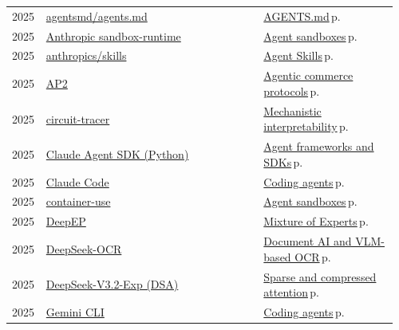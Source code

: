 \documentclass[10pt,a4paper,openany]{report}
\begin{document}
{\begin{longtable}{@{}p{0.07\linewidth}>{\raggedright}p{0.55\linewidth}>{\raggedright\arraybackslash}p{0.34\linewidth}@{}}
2025 & \href{https://github.com/agentsmd/agents.md}{agentsmd/agents.md} & \hyperref[c:protocols-6]{AGENTS.md}\,{\color{muted}\scriptsize p.\,\pageref{c:protocols-6}}\\
2025 & \href{https://github.com/anthropic-experimental/sandbox-runtime}{Anthropic sandbox-runtime} & \hyperref[c:agents-11]{Agent sandboxes}\,{\color{muted}\scriptsize p.\,\pageref{c:agents-11}}\\
2025 & \href{https://github.com/anthropics/skills}{anthropics/skills} & \hyperref[c:protocols-5]{Agent Skills}\,{\color{muted}\scriptsize p.\,\pageref{c:protocols-5}}\\
2025 & \href{https://github.com/google-agentic-commerce/AP2}{AP2} & \hyperref[c:protocols-9]{Agentic commerce protocols}\,{\color{muted}\scriptsize p.\,\pageref{c:protocols-9}}\\
2025 & \href{https://github.com/safety-research/circuit-tracer}{circuit-tracer} & \hyperref[c:safety-6]{Mechanistic interpretability}\,{\color{muted}\scriptsize p.\,\pageref{c:safety-6}}\\
2025 & \href{https://github.com/anthropics/claude-agent-sdk-python}{Claude Agent SDK (Python)} & \hyperref[c:agents-12]{Agent frameworks and SDKs}\,{\color{muted}\scriptsize p.\,\pageref{c:agents-12}}\\
2025 & \href{https://github.com/anthropics/claude-code}{Claude Code} & \hyperref[c:coding-0]{Coding agents}\,{\color{muted}\scriptsize p.\,\pageref{c:coding-0}}\\
2025 & \href{https://github.com/dagger/container-use}{container-use} & \hyperref[c:agents-11]{Agent sandboxes}\,{\color{muted}\scriptsize p.\,\pageref{c:agents-11}}\\
2025 & \href{https://github.com/deepseek-ai/DeepEP}{DeepEP} & \hyperref[c:arch-0]{Mixture of Experts}\,{\color{muted}\scriptsize p.\,\pageref{c:arch-0}}\\
2025 & \href{https://github.com/deepseek-ai/DeepSeek-OCR}{DeepSeek-OCR} & \hyperref[c:vlm-4]{Document AI and VLM-based OCR}\,{\color{muted}\scriptsize p.\,\pageref{c:vlm-4}}\\
2025 & \href{https://github.com/deepseek-ai/DeepSeek-V3.2-Exp}{DeepSeek-V3.2-Exp (DSA)} & \hyperref[c:arch-2]{Sparse and compressed attention}\,{\color{muted}\scriptsize p.\,\pageref{c:arch-2}}\\
2025 & \href{https://github.com/google-gemini/gemini-cli}{Gemini CLI} & \hyperref[c:coding-0]{Coding agents}\,{\color{muted}\scriptsize p.\,\pageref{c:coding-0}}\\

\end{longtable}}
\end{document}
